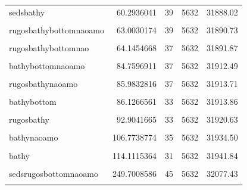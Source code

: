 \documentclass[
]{article}
\let\origtable\table
\let\endorigtable\endtable
\renewenvironment{table}[1][2] {
    \expandafter\origtable\expandafter[H]
} {
    \endorigtable
}
\begin{document}
\begin{table}[H]
\begin{tabular}[t]{lrrrr}
\addlinespace
sedsbathy & 60.2936041 & 39 & 5632 & 31888.02\\
\cellcolor{gray!10}{rugosbathybottomamo} & \cellcolor{gray!10}{62.3041648} & \cellcolor{gray!10}{37} & \cellcolor{gray!10}{5632} & \cellcolor{gray!10}{31890.03}\\
rugosbathybottomnaoamo & 63.0030174 & 39 & 5632 & 31890.73\\
\cellcolor{gray!10}{rugosbathybottom} & \cellcolor{gray!10}{63.9483351} & \cellcolor{gray!10}{35} & \cellcolor{gray!10}{5632} & \cellcolor{gray!10}{31891.68}\\
rugosbathybottomnao & 64.1454668 & 37 & 5632 & 31891.87\\
\addlinespace
\cellcolor{gray!10}{bathybottomamo} & \cellcolor{gray!10}{84.2510758} & \cellcolor{gray!10}{35} & \cellcolor{gray!10}{5632} & \cellcolor{gray!10}{31911.98}\\
bathybottomnaoamo & 84.7596911 & 37 & 5632 & 31912.49\\
\cellcolor{gray!10}{rugosbathyamo} & \cellcolor{gray!10}{85.4995550} & \cellcolor{gray!10}{35} & \cellcolor{gray!10}{5632} & \cellcolor{gray!10}{31913.23}\\
rugosbathynaoamo & 85.9832816 & 37 & 5632 & 31913.71\\
\cellcolor{gray!10}{bathybottomnao} & \cellcolor{gray!10}{86.0862582} & \cellcolor{gray!10}{35} & \cellcolor{gray!10}{5632} & \cellcolor{gray!10}{31913.82}\\
\addlinespace
bathybottom & 86.1266561 & 33 & 5632 & 31913.86\\
\cellcolor{gray!10}{rugosbathynao} & \cellcolor{gray!10}{92.5446440} & \cellcolor{gray!10}{35} & \cellcolor{gray!10}{5632} & \cellcolor{gray!10}{31920.27}\\
rugosbathy & 92.9041665 & 33 & 5632 & 31920.63\\
\cellcolor{gray!10}{bathyamo} & \cellcolor{gray!10}{106.5076105} & \cellcolor{gray!10}{33} & \cellcolor{gray!10}{5632} & \cellcolor{gray!10}{31934.24}\\
bathynaoamo & 106.7738774 & 35 & 5632 & 31934.50\\
\addlinespace
\cellcolor{gray!10}{bathynao} & \cellcolor{gray!10}{113.4711624} & \cellcolor{gray!10}{33} & \cellcolor{gray!10}{5632} & \cellcolor{gray!10}{31941.20}\\
bathy & 114.1115364 & 31 & 5632 & 31941.84\\
\cellcolor{gray!10}{sedsrugosbottomnao} & \cellcolor{gray!10}{249.0554839} & \cellcolor{gray!10}{43} & \cellcolor{gray!10}{5632} & \cellcolor{gray!10}{32076.78}\\
sedsrugosbottomnaoamo & 249.7008586 & 45 & 5632 & 32077.43\\
\cellcolor{gray!10}{sedsrugosbottom} & \cellcolor{gray!10}{250.3797688} & \cellcolor{gray!10}{41} & \cellcolor{gray!10}{5632} & \cellcolor{gray!10}{32078.11}\\
\bottomrule
\end{tabular}
\end{table}
\end{document}
